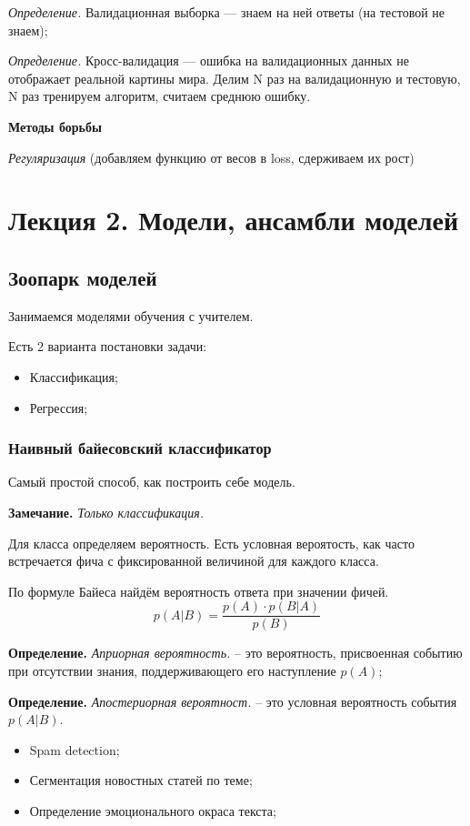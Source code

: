 \documentclass[a4paper,14pt]{article}
\begin{document}
{\it Определение.} Валидационная выборка --- знаем на ней ответы (на тестовой не знаем);

{\it Определение.} Кросс-валидация --- ошибка на валидационных данных не отображает реальной картины мира.
Делим N раз на валидационную и тестовую, N раз тренируем алгоритм, считаем среднюю ошибку.

{\bf Методы борьбы}

{\it Регуляризация} (добавляем функцию от весов в loss, сдерживаем их рост)

\newpage
\section{ Лекция 2. Модели, ансамбли моделей }
    \subsection{Зоопарк моделей}
    Занимаемся моделями обучения с учителем.

    Есть 2 варианта постановки задачи:
    \begin{itemize}
        \item Классификация;
        \item Регрессия;
    \end{itemize}

    \subsubsection{Наивный байесовский классификатор}
    Самый простой способ, как построить себе модель.

    {\bf Замечание.} { \it Только классификация.}

    Для класса определяем вероятность. Есть условная вероятость, как часто встречается фича с фиксированной величиной для каждого класса.

    По формуле Байеса найдём вероятность ответа при значении фичей.
    \[
        p(A|B) = \frac{p(A) \cdot p(B|A) }{ p(B) }
    \]

    {\bf Определение.} { \it Априорная вероятность.} -- это вероятность, присвоенная событию при отсутствии знания, поддерживающего его наступление $p(A)$;

    {\bf Определение.} { \it Апостериорная вероятност.} -- это условная вероятность события $p(A|B)$.


    \begin{itemize}
        \item Spam detection;
        \item Сегментация новостных статей по теме;
        \item Определение эмоционального окраса текста;
    \end{itemize}
\end{document}

